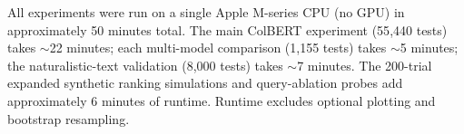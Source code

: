 \documentclass[11pt]{article}
\begin{document}
All experiments were run on a single Apple M-series CPU (no GPU) in approximately 50 minutes total. The main ColBERT experiment (55{,}440 tests) takes $\sim$22 minutes; each multi-model comparison (1{,}155 tests) takes $\sim$5 minutes; the naturalistic-text validation (8{,}000 tests) takes $\sim$7 minutes. The 200-trial expanded synthetic ranking simulations and query-ablation probes add approximately 6 minutes of runtime. Runtime excludes optional plotting and bootstrap resampling.
\end{document}
